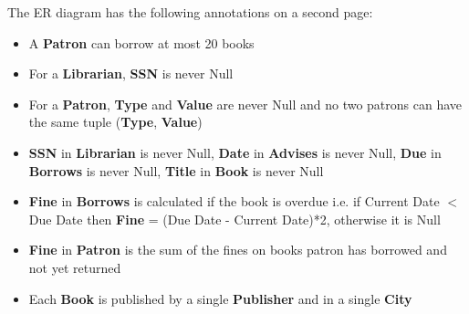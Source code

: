 \documentclass[9pt]{article}
\begin{document}
The ER diagram has the following annotations on a second page:
\begin{itemize}
    \item A \textbf{Patron} can borrow at most 20 books
    \item For a \textbf{Librarian}, \textbf{SSN} is never Null
    \item For a \textbf{Patron}, \textbf{Type} and \textbf{Value} are never Null and no two patrons can have the same tuple (\textbf{Type}, \textbf{Value})
    \item \textbf{SSN} in \textbf{Librarian} is never Null, \textbf{Date} in \textbf{Advises} is never Null, \textbf{Due} in \textbf{Borrows} is never Null, \textbf{Title} in \textbf{Book} is never Null
    \item \textbf{Fine} in \textbf{Borrows} is calculated if the book is overdue i.e. if Current Date $<$ Due Date then \textbf{Fine} = (Due Date - Current Date)*2, otherwise it is Null
    \item \textbf{Fine} in \textbf{Patron} is the sum of the fines on books patron has borrowed and not yet returned
    \item Each \textbf{Book} is published by a single \textbf{Publisher} and in a single \textbf{City}
\end{itemize}
\end{document}
